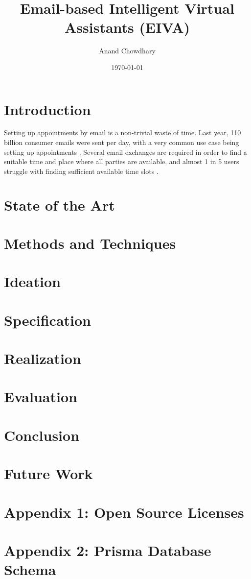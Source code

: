 \documentclass{article}
\title{Email-based Intelligent Virtual Assistants (EIVA)}
\author{Anand Chowdhary}
\date{\today}
\begin{document}
  \maketitle
  \newpage
  \tableofcontents
  \newpage
  \listoffigures
  \enspace
  \listoftables
  \newpage
  

\section{Introduction}

Setting up appointments by email is a non-trivial waste of time. Last year, 110 billion consumer emails were sent per day, with a very common use case being setting up appointments \cite{noauthor_email_2019}. Several email exchanges are required in order to find a suitable time and place where all parties are available, and almost 1 in 5 users struggle with finding sufficient available time slots \cite{blaszkiewicz_research_2018}.

\section{State of the Art}

\section{Methods and Techniques}

\section{Ideation}

\section{Specification}

\section{Realization}

\section{Evaluation}

\section{Conclusion}

\section{Future Work}

\newpage

\section*{Appendix 1: Open Source Licenses}

\newpage

\section*{Appendix 2: Prisma Database Schema}

\newpage



\end{document}
